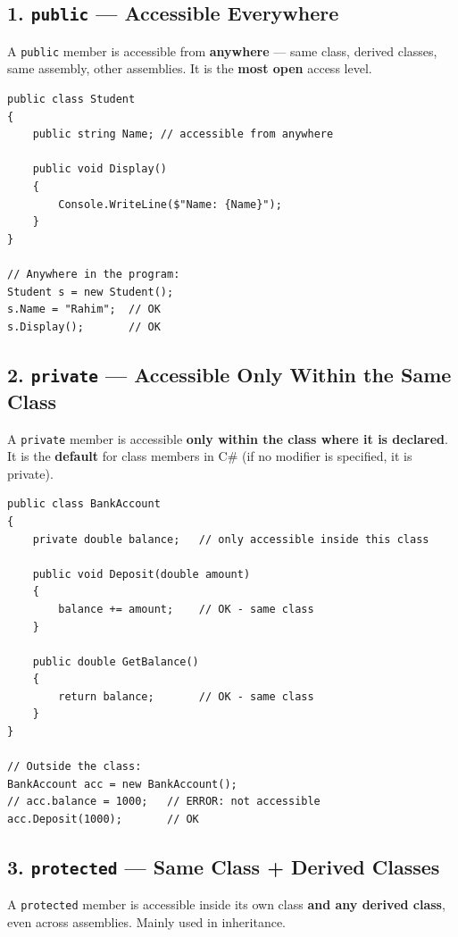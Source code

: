\documentclass[11pt,a4paper]{article}
\begin{document}
\subsection{1. \texttt{public} — Accessible Everywhere}

A \texttt{public} member is accessible from \textbf{anywhere} — same class, derived classes, same assembly, other assemblies. It is the \textbf{most open} access level.

\begin{lstlisting}[caption={public modifier}]
public class Student
{
    public string Name; // accessible from anywhere

    public void Display()
    {
        Console.WriteLine($"Name: {Name}");
    }
}

// Anywhere in the program:
Student s = new Student();
s.Name = "Rahim";  // OK
s.Display();       // OK
\end{lstlisting}

\subsection{2. \texttt{private} — Accessible Only Within the Same Class}

A \texttt{private} member is accessible \textbf{only within the class where it is declared}. It is the \textbf{default} for class members in C\# (if no modifier is specified, it is private).

\begin{lstlisting}[caption={private modifier}]
public class BankAccount
{
    private double balance;   // only accessible inside this class

    public void Deposit(double amount)
    {
        balance += amount;    // OK - same class
    }

    public double GetBalance()
    {
        return balance;       // OK - same class
    }
}

// Outside the class:
BankAccount acc = new BankAccount();
// acc.balance = 1000;   // ERROR: not accessible
acc.Deposit(1000);       // OK
\end{lstlisting}

\subsection{3. \texttt{protected} — Same Class + Derived Classes}

A \texttt{protected} member is accessible inside its own class \textbf{and any derived class}, even across assemblies. Mainly used in inheritance.
\end{document}
